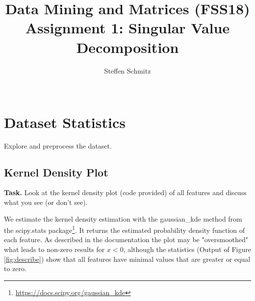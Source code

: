\documentclass{support/acm_proc_article-sp}
\begin{document}
    \title{Data Mining and Matrices (FSS18) \\ Assignment 1: Singular Value Decomposition}

    \author{
    \alignauthor
    Steffen Schmitz\\
    \\
    }

    \maketitle


    \section{Dataset Statistics}
    \vspace{1.5\baselineskip}

    Explore and preprocess the dataset.


    \subsection{Kernel Density Plot}
    \label{sec:kdp}
    \vspace{\baselineskip}

    \textbf{Task.} Look at the kernel density plot (code provided) of all features and discuss what you see (or don't see).

    We estimate the kernel density estimation with the gaussian\_kde method from the scipy.stats
    package\footnote{\href{https://docs.scipy.org/doc/scipy/reference/generated/scipy.stats.gaussian_kde.html}{https://docs.scipy.org/gaussian\_kde}}.
    It returns the estimated probability density function of each feature.
    As described in the documentation the plot may be "oversmoothed" what leads to non-zero results for $x < 0$,
    although the statistics (Output of Figure \ref{fig:describe}) show that all features have minimal values that are
    greater or equal to zero.


    
    
\end{document}
